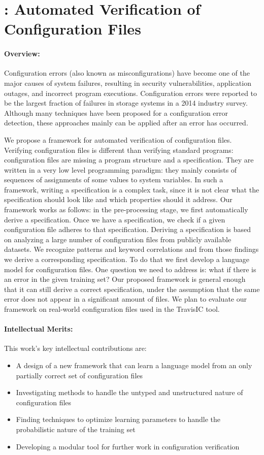 \section*{\app: Automated Verification of Configuration Files}
\paragraph{Overview:} 
Configuration errors (also known as misconfigurations) have become one of the major causes of system failures, resulting in security vulnerabilities, application outages, and incorrect program executions. 
Configuration errors were reported to be the largest fraction of failures in storage systems in a 2014 industry survey. 
Although many techniques have been proposed for a configuration error detection, these approaches mainly can be applied after an error has occurred.

We propose a framework for automated verification of configuration files. 
Verifying configuration files is different than verifying standard programs: configuration
files are missing a program structure and a specification. They are written in a
very low level programming paradigm: they mainly consists of sequences of assignments 
of some 
values to system variables. In such a framework, writing a specification is a complex task, 
since it is not clear what the specification should look like and which properties should 
it address. Our framework works as follows: in the pre-processing stage, 
we first automatically derive a specification. Once we have a specification, 
we check if a given configuration 
file adheres to that specification.
Deriving a specification is based on analyzing a large number of configuration files from publicly available 
datasets. We recognize patterns and keyword correlations and from those findings we derive 
a corresponding specification. To do that we first develop a language model for configuration files. One question we 
need to address is: what if there is an error in the given training set? Our proposed framework 
is general enough that it can still derive a correct specification, under 
the assumption that the same error does not appear in a significant amount of files.
We plan to evaluate our framework on real-world configuration files 
used in the TravisIC tool.

\paragraph{Intellectual Merits:} This work's key intellectual contributions are:
\begin{itemize}
\item A design of a new framework that can learn a language model from an only partially correct set of configuration files
\item Investigating methods to handle the untyped and unstructured nature of configuration files
\item Finding techniques to optimize learning parameters to handle the probabilistic nature of the training set
\item Developing a modular tool for further work in configuration verification
\end{itemize}

